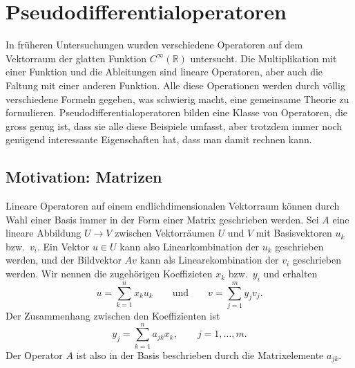 %
%
%
\section{Pseudodifferentialoperatoren
\label{buch:opertoren:section:pseudodifferentialoperatoren}}
In früheren Untersuchungen wurden verschiedene Operatoren
auf dem Vektorraum der glatten Funktion $C^\infty(\mathbb{R})$ 
untersucht.
Die Multiplikation mit einer Funktion und die Ableitungen sind 
lineare Operatoren, aber auch die Faltung mit einer anderen Funktion.
Alle diese Operationen werden durch völlig verschiedene Formeln
gegeben, was schwierig macht, eine gemeinsame Theorie zu formulieren.
Pseudodifferentialoperatoren bilden eine Klasse von Operatoren, die
gross genug ist, dass sie alle diese Beispiele umfasst, aber trotzdem
immer noch genügend interessante Eigenschaften hat, dass man damit
rechnen kann.

%
%
\subsection{Motivation: Matrizen
\label{buch:operatoren:pseudodifferential:subsection:motivation}}
Lineare Operatoren auf einem endlichdimensionalen Vektorraum können
durch Wahl einer Basis immer in der Form einer Matrix geschrieben
werden.
Sei $A$ eine lineare Abbildung $U\to V$ zwischen Vektorräumen
$U$ und $V$ mit Basisvektoren $u_k$ bzw.~$v_i$.
Ein Vektor $u\in U$ kann also Linearkombination der $u_k$ geschrieben
werden, und der Bildvektor $Av$ kann als Linearekombination der $v_i$
geschrieben werden.
Wir nennen die zugehörigen Koeffizieten $x_k$ bzw.~$y_i$ und erhalten
\[
u = \sum_{k=1}^n x_ku_k
\qquad\text{und}\qquad
v = \sum_{j=1}^m y_jv_j.
\]
Der Zusammenhang zwischen den Koeffizienten ist
\[
y_j = \sum_{k=1}^n a_{jk}x_k,\qquad j=1,\dots,m.
\]
Der Operator $A$ ist also in der Basis beschrieben durch die Matrixelemente
$a_{jk}$.

